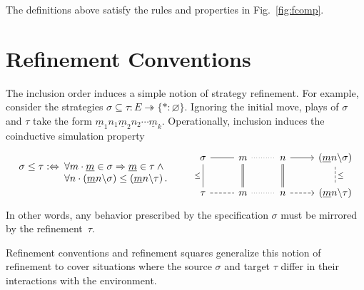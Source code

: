 \documentclass[acmsmall,screen,review,anonymous,nonacm]{acmart}
\begin{document}
\begin{theorem} %
The definitions above satisfy the rules and properties
in Fig.~\ref{fig:fcomp}.
\end{theorem}




\section{Refinement Conventions} \label{sec:refconv} %

The inclusion order induces a simple notion of strategy refinement.
For example,
consider the strategies
$\sigma \subseteq \tau : E \twoheadrightarrow \{ {*} : \varnothing \}$.
Ignoring the initial move,
plays of $\sigma$ and $\tau$ take the form
$
  \underline{m}_1 n_1 \underline{m}_2 n_2 \cdots \underline{m}_k
$.
Operationally,
inclusion induces the coinductive simulation property
\begin{equation} \label{eqn:sim}
  \begin{array}{r@{\:}l}
  \sigma \le \tau :\Leftrightarrow {} &
  \forall m \cdot
    \underline{m} \in \sigma \Rightarrow
    \underline{m} \in \tau \wedge {} \\ &
  \forall n \cdot
    (\underline{m} n \backslash \sigma) \le
    (\underline{m} n \backslash \tau)
  \,.
  \end{array}
  \qquad
  \begin{tikzcd}
    \sigma \ar[r,dash] \ar[d, dash, "\le"'] &
    m \ar[r,dotted,dash] \ar[d,equal] &
    n \ar[r] \ar[d,equal] &
    (\underline{m} n \backslash \sigma) \ar[d, dash, dashed, "\le"]
    \\
    \tau \ar[r,dash, dashed] &
    m \ar[r,dotted,dash] &
    n \ar[r,dashed] &
    (\underline{m} n \backslash \tau)
  \end{tikzcd}
\end{equation}
In other words,
any behavior prescribed by the specification $\sigma$
must be mirrored by the refinement~$\tau$.

Refinement conventions and refinement squares
generalize this notion of refinement
to cover situations where the source $\sigma$ and target $\tau$
differ in their interactions with the environment.
\end{document}
